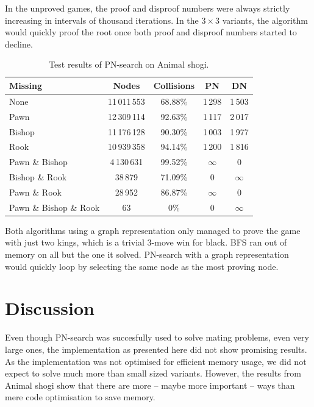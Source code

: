 \documentclass{article}
\begin{document}
In the unproved games, the proof and disproof numbers were always strictly increasing in intervals of thousand iterations. In the $3 \times 3$ variants,
the algorithm would quickly proof the root once both proof and disproof numbers started to decline. \\

\begin{table}
\begin{tabular}{| l | c c c c |}
\hline
 Missing & Nodes & Collisions & PN & DN\\ \hline
 None                   & 11\,011\,553  & 68.88\% & 1\,298 & 1\,503\\
 Pawn                   & 12\,309\,114  & 92.63\% & 1\,117 & 2\,017\\
 Bishop                 & 11\,176\,128  & 90.30\% & 1\,003 & 1\,977\\
 Rook                   & 10\,939\,358  & 94.14\% & 1\,200 & 1\,816\\
 Pawn \& Bishop         & 4\,130\,631   & 99.52\% & $\infty$ & 0\\
 Bishop \& Rook         & 38\,879       & 71.09\% & 0 & $\infty$\\
 Pawn \& Rook           & 28\,952       & 86.87\% & $\infty$ & 0\\
 Pawn \& Bishop \& Rook & 63            & 0\% & 0 & $\infty$\\
\hline
\end{tabular}
\caption{Test results of PN-search on Animal shogi.}
\label{animalresult}
\end{table}

Both algorithms using a graph representation only managed to prove the game with just two kings, which is a trivial 3-move win for black. BFS ran out of memory on all
but the one it solved. PN-search with a graph representation would quickly loop by selecting the same node as the most proving node.

\section{Discussion}
\label{sec:disc}

Even though PN-search was succesfully used to solve mating problems, even very large ones, the implementation as presented here did not show promising results. As the implementation
was not optimised for efficient memory usage, we did not expect to solve much more than small sized variants. However, the results from Animal shogi show that there are more -- maybe
more important -- ways than mere code optimisation to save memory.
\end{document}
